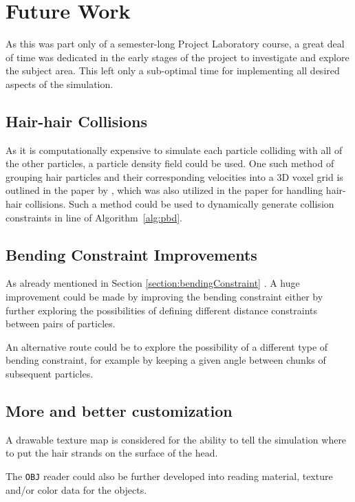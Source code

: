 \documentclass[sigplan,screen,nonacm]{acmart}
\begin{document}
\section{Future Work}
\label{sec:future_work}
As this was part only of a semester-long Project Laboratory course, a great deal
of time was dedicated in the early stages of the project to investigate and
explore the subject area. This left only a sub-optimal time for implementing all
desired aspects of the simulation.

\subsection{Hair-hair Collisions}
\label{subsec:future_work_collision}
As it is computationally expensive to simulate each particle colliding with all
of the other particles, a particle density field could be used. One such method
of grouping hair particles and their corresponding velocities into a 3D voxel
grid is outlined in the paper by \citet{PixarVolumetricHair}, which was also
utilized in the \citet{FTLHair} paper for handling hair-hair collisions.
Such a method could be used to dynamically generate collision constraints in
line  of Algorithm~\ref{alg:pbd}.

\subsection{Bending Constraint Improvements}
As already mentioned in Section \ref{section:bendingConstraint}
. A huge improvement could be made by
improving the bending constraint either by further exploring the possibilities
of defining different distance constraints between pairs of particles.

An alternative route could be to explore the possibility of a different type of
bending constraint, for example by keeping a given angle between chunks of
subsequent particles.

\subsection{More and better customization} 
\label{section:futureCustomization}
A drawable texture map is considered for the ability to tell the simulation
where to put the hair strands on the surface of the head.

The \texttt{OBJ} reader could also be further developed into reading material,
texture and/or color data for the objects.
\end{document}
